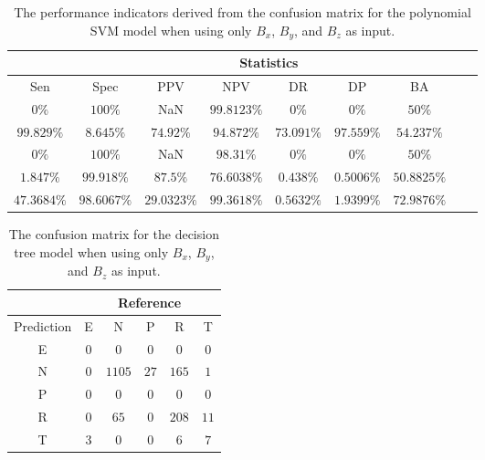 \begin{table}[!ht]
	\centering
	\begin{tabular}{|c|c|c|c|c|c|c|c|c|}
		\hline
		 & \multicolumn{7}{c|}{Statistics} \\ \hline
		Sen & Spec & PPV & NPV & DR & DP & BA \\ \hline
		$0\%$ & $100\%$ & NaN & $99.8123\%$ & $0\%$ & $0\%$ & $50\%$ \\ \hline
		$99.829\%$ & $8.645\%$ & $74.92\%$ & $94.872\%$ & $73.091\%$ & $97.559\%$ & $54.237\%$ \\ \hline
		$0\%$ & $100\%$ & NaN & $98.31\%$ & $0\%$ & $0\%$ & $50\%$ \\ \hline
		$1.847\%$ & $99.918\%$ & $87.5\%$ & $76.6038\%$ & $0.438\%$ & $0.5006\%$ & $50.8825\%$ \\ \hline
		$47.3684\%$ & $98.6067\%$ & $29.0323\%$ & $99.3618\%$ & $0.5632\%$ & $1.9399\%$ & $72.9876\%$ \\ \hline
	\end{tabular}
	\caption{The performance indicators derived from the confusion matrix for the polynomial SVM model when using only $B_{x}$, $B_{y}$, and $B_{z}$ as input.}
	\label{tab:cs:coord:svmPoly}
\end{table}

\begin{table}[!ht]
	\centering
	\begin{tabular}{|c|c|c|c|c|c|}
		\hline
		 & \multicolumn{5}{|c|}{Reference} \\ \hline
		 Prediction & E & N & P & R & T \\ \hline
		 E & $0$ & $0$ & $0$ & $0$ & $0$ \\ \hline
		 N & $0$ & $1105$ & $27$ & $165$ & $1$ \\ \hline
		 P & $0$ & $0$ & $0$ & $0$ & $0$ \\ \hline
		 R & $0$ & $65$ & $0$ & $208$ & $11$ \\ \hline
		 T & $3$ & $0$ & $0$ & $6$ & $7$ \\ \hline
	\end{tabular}
	\caption{The confusion matrix for the decision tree model when using only $B_{x}$, $B_{y}$, and $B_{z}$ as input.}
	\label{tab:cm:coord:C5.0}
\end{table}

